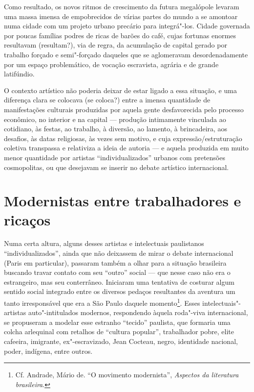 Como resultado, os novos ritmos de crescimento da futura megalópole
levaram uma massa imensa de empobrecidos de várias partes do mundo a se
amontoar numa cidade com um projeto urbano precário para integrá"-los.
Cidade governada por poucas famílias podres de ricas de barões do café,
cujas fortunas enormes resultavam (resultam?), via de
regra, da acumulação de capital gerado por trabalho
forçado e semi"-forçado daqueles que se aglomeravam desordenadamente por
um espaço problemático, de vocação escravista, agrária e de grande
latifúndio.

O contexto artístico não poderia deixar de estar ligado a essa situação,
e uma diferença clara se colocava (se coloca?) entre a imensa quantidade
de manifestações culturais produzidas por aquela gente desfavorecida
pelo processo econômico, no interior e na capital --- produção
intimamente vinculada ao cotidiano, às festas, ao trabalho, à diversão,
ao lamento, à brincadeira, aos desafios, às datas religiosas, às vezes
sem motivo, e cuja expressão/estruturação coletiva transpassa e
relativiza a ideia de autoria --- e aquela produzida em muito menor
quantidade por artistas ``individualizados'' urbanos com pretensões
cosmopolitas, ou que desejavam se inserir no debate artístico
internacional.

\section{Modernistas entre trabalhadores e ricaços}

Numa certa altura, alguns desses artistas e intelectuais paulistanos ``individualizados'', ainda que
não deixassem de mirar o debate internacional (Paris em particular),
passaram também a olhar para a situação brasileira buscando travar
contato com seu ``outro'' social --- que nesse caso não era o
estrangeiro, mas seu conterrâneo. Iniciaram uma tentativa de costurar
algum sentido social integrado entre os diversos pedaços resultantes da
aventura um tanto irresponsável que era a São Paulo daquele
momento\footnote{Cf. Andrade, Mário de. ``O movimento modernista'',
  \emph{Aspectos da literatura brasileira}.}. Esses
intelectuais"-artistas auto"-intitulados modernos, respondendo àquela
roda"-viva internacional, se propuseram a modelar esse estranho
``tecido'' paulista, que formaria uma colcha arlequinal com retalhos de ``cultura
popular'', trabalhador pobre, elite cafeeira, imigrante, ex"-escravizado,
Jean Cocteau, negro, identidade nacional, poder, indígena, entre outros.

